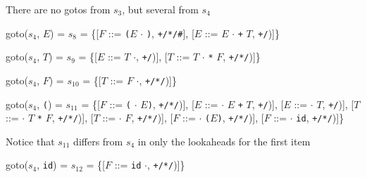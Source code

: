 \documentclass[8pt,a4paper,compress]{beamer}
\newcommand{\mm}[1]{$#1$}
\newcommand{\subs}[2]{${#1}_{#2}$}
\newenvironment{spaced}
{
\smallskip
\hspace{.5cm}
\begin{minipage}[c]{\textwidth}
}
{
\end{minipage}
\smallskip
}
\begin{document}
\begin{frame}[fragile]
\pause

There are no gotos from $s_3$, but several from $s_4$

\text{ }
\begin{spaced}
\begin{production}
goto(\subs{s}{4}, \mm{E}) = \subs{s}{8}
                = \{[\mm{F}  ::= \lstinline{(}\mm{E} \mm{\cdot} \lstinline{)},  \lstinline{+/*/#}],
                    [\mm{E}  ::= \mm{E} \mm{\cdot} \lstinline{+} \mm{T}, \lstinline{+/})]\}

goto(\subs{s}{4}, \mm{T}) = \subs{s}{9}
                = \{[\mm{E}  ::= \mm{T} \mm{\cdot}, \lstinline{+/})],
                    [\mm{T}  ::= \mm{T} \mm{\cdot} \lstinline{*} \mm{F}, \lstinline{+/*/})]\}

goto(\subs{s}{4}, \mm{F}) = \subs{s}{10}
                = \{[\mm{T}  ::= \mm{F} \mm{\cdot}, \lstinline{+/*/})]\}

goto(\subs{s}{4}, \lstinline{(}) = \subs{s}{11}
               = \{[\mm{F}  ::= \lstinline{(} \mm{\cdot} \mm{E}\lstinline{)}, \lstinline{+/*/})],
                    [\mm{E}  ::= \mm{\cdot} \mm{E} \lstinline{+} \mm{T}, \lstinline{+/})],
                    [\mm{E}  ::= \mm{\cdot} \mm{T}, \lstinline{+/})],
                    [\mm{T}  ::= \mm{\cdot} \mm{T} \lstinline{*} \mm{F}, \lstinline{+/*/})],
                    [\mm{T}  ::= \mm{\cdot} \mm{F}, \lstinline{+/*/})],
                    [\mm{F}  ::= \mm{\cdot} \lstinline{(}\mm{E}\lstinline{)}, \lstinline{+/*/})],
                    [\mm{F}  ::= \mm{\cdot} \lstinline{id}, \lstinline{+/*/})]\}
\end{production}
\end{spaced}

\pause

Notice that $s_{11}$ differs from $s_4$ in only the lookaheads for the first item

\text{ }
\begin{spaced}
\begin{production}
goto(\subs{s}{4}, \lstinline{id}) = \subs{s}{12}
                = \{[\mm{F}  ::= \lstinline{id} \mm{\cdot}, \lstinline{+/*/})]\}
\end{production}
\end{spaced}
\end{frame}
\end{document}

